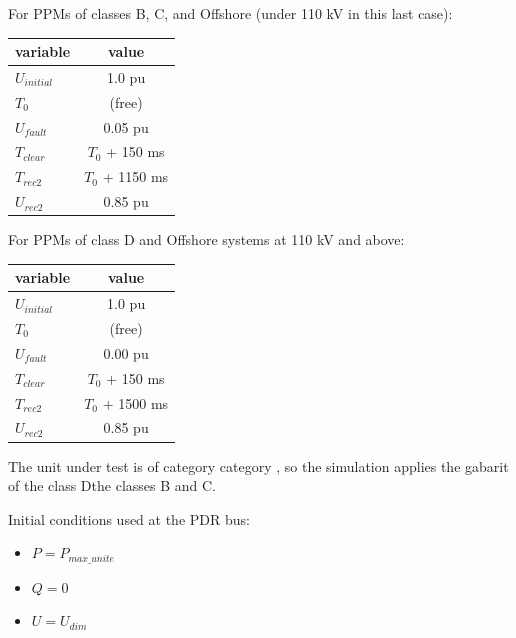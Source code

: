     For PPMs of classes B, C, and Offshore (under 110 kV in this last case):
    \begin{center}
        \begin{tabular}{lc}
            \toprule
            \textbf{variable} & \textbf{value} \\
            \midrule
            $U_{initial}$     & 1.0 pu                   \\
            $T_{0}$           & (free)                   \\
            $U_{fault}$       & 0.05 pu                  \\
            $T_{clear}$       & $T_{0}$ + 150 ms         \\
            $T_{rec2}$        & $T_{0}$ + 1150 ms        \\
            $U_{rec2}$        & 0.85 pu                  \\
            \bottomrule
        \end{tabular}
    \end{center}

    For PPMs of class D and Offshore systems at 110 kV and above:
    \begin{center}
        \begin{tabular}{lc}
            \toprule
            \textbf{variable} & \textbf{value} \\
            \midrule
            $U_{initial}$     & 1.0 pu                   \\
            $T_{0}$           & (free)                   \\
            $U_{fault}$       & 0.00 pu                  \\
            $T_{clear}$       & $T_{0}$ + 150 ms         \\
            $T_{rec2 }$       & $T_{0}$ + 1500 ms        \\
            $U_{rec2}$        & 0.85 pu                  \\
            \bottomrule
        \end{tabular}
    \end{center}

    \noindent The unit under test is of category {{ category }}, so the simulation
    applies the gabarit of the class Dthe classes B and C.

    \begin{description}
        \item Initial conditions used at the PDR bus:
        \begin{itemize}
            \item $P = P_{max\_unite}$
            \item $Q = 0$
            \item $U = U_{dim}$
        \end{itemize}
    \end{description}

